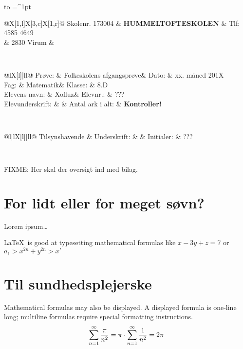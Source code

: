 \documentclass[a4,12pt]{article}
\makeatletter
\newcommand{\skoleklasse}{8.D}
\newcommand{\proevetype}{Folkeskolens afgangsprøve}
\newcommand{\proevefag}{Matematik}
\newcommand{\elevnavn}{Xofluz}
\newcommand{\elevnummer}{???}
\newcommand{\tilsynshavende}{???}
\newcommand{\eksamensdato}{xx. måned 201X}
\newcommand{\antalarkialt}{\pageref{LastPage} \textbf{Kontroller!}}
\newcommand{\eksamensforsideboks}{
\noindent
\begin{tabu} to  \textwidth {|X[c]|}
  \hline
  \tabulinesep=^1pt
  \begin{tabu} {@{}X[1,l]X[3,c]X[1,r]@{}}
    Skolenr. 173004 & {\large \textbf{HUMMELTOFTESKOLEN}} & Tlf: 4585 4649 \\
  & 2830 Virum & \\
  \end{tabu} \\
  \hline
  \begin{tabu} {@{}lX[l]|ll@{}}
    Prøve: & \proevetype & Dato: & \eksamensdato \\
    Fag: & \proevefag & Klasse: & \skoleklasse \\
    Elevens navn: & \elevnavn & Elevnr.: & \elevnummer \\
    Elevunderskrift: & & Antal ark i alt: & \antalarkialt \\[0.5cm]
  \end{tabu} \\
  \hline
  \begin{tabu} {@{}l|lX[l]|ll@{}}
    Tilsynshavende & Underskrift: & & Initialer: & \tilsynshavende \\[0.5cm]
  \end{tabu} \\
  \hline
\end{tabu}
\vspace{1cm}
}
\makeatother
\begin{document}
\thispagestyle{plain}
\eksamensforsideboks


FIXME: Her skal der oversigt ind med bilag.

\section{For lidt eller for meget søvn?}

Lorem ipsum\ldots

\LaTeX\ is good at typesetting mathematical formulas
like
       \( x-3y + z = 7 \) 
or
       \( a_{1} > x^{2n} + y^{2n} > x' \)

\section{Til sundhedsplejerske}
Mathematical formulas may also be displayed.
A displayed formula is one-line long; multiline
formulas require special formatting instructions.
\[
  \sum\limits_{n=1}^\infty{\pi \over n^2} = \pi \cdot \sum\limits_{n=1}^\infty{1 \over n^2} = 2\pi
\]

\end{document}
